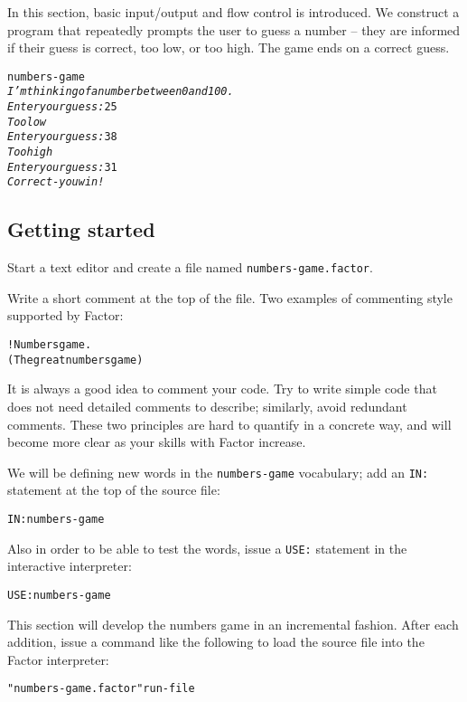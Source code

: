 \documentclass[english]{article}
\begin{document}
In this section, basic input/output and flow control is introduced.
We construct a program that repeatedly prompts the user to guess a
number -- they are informed if their guess is correct, too low, or
too high. The game ends on a correct guess.

\begin{alltt}
numbers-game
\emph{I'm thinking of a number between 0 and 100.}
\emph{Enter your guess:} 25
\emph{Too low}
\emph{Enter your guess:} 38
\emph{Too high}
\emph{Enter your guess:} 31
\emph{Correct - you win!}
\end{alltt}

\subsection{Getting started}

Start a text editor and create a file named \texttt{numbers-game.factor}.

Write a short comment at the top of the file. Two examples of commenting style supported by Factor:

\begin{alltt}
! Numbers game.
( The great numbers game )
\end{alltt}

It is always a good idea to comment your code. Try to write simple
code that does not need detailed comments to describe; similarly,
avoid redundant comments. These two principles are hard to quantify
in a concrete way, and will become more clear as your skills with
Factor increase.

We will be defining new words in the \texttt{numbers-game} vocabulary; add
an \texttt{IN:} statement at the top of the source file:

\begin{alltt}
IN: numbers-game
\end{alltt}
Also in order to be able to test the words, issue a \texttt{USE:}
statement in the interactive interpreter:

\begin{alltt}
USE: numbers-game
\end{alltt}
This section will develop the numbers game in an incremental fashion.
After each addition, issue a command like the following to load the
source file into the Factor interpreter:

\begin{alltt}
"numbers-game.factor" run-file
\end{alltt}
\end{document}
